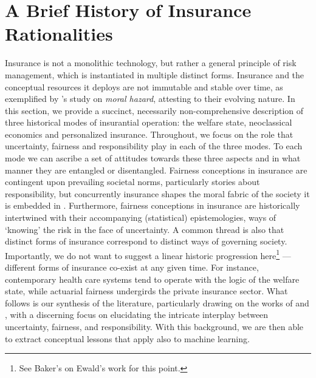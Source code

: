\documentclass[11pt]{article} %
\begin{document}
\section{A Brief History of Insurance Rationalities}
Insurance is not a monolithic technology, but rather a general principle of risk management, which is instantiated in multiple distinct forms. %
Insurance and the conceptual resources it deploys are not immutable and stable over time, as exemplified by \citeauthor{baker1996genealogy}'s \citeyearpar{baker1996genealogy} study on \textit{moral hazard}, attesting to their evolving nature. 
In this section, we provide a succinct, necessarily non-comprehensive description of three historical modes of insurantial operation: the welfare state, neoclassical economics and personalized insurance. 
Throughout, we focus on the role that uncertainty, fairness and responsibility play in each of the three modes.
To each mode we can ascribe a set of attitudes towards these three aspects and in what manner they are entangled or disentangled.
Fairness conceptions in insurance are contingent upon prevailing societal norms, particularly stories about responsibility, but concurrently insurance shapes the moral fabric of the society it is embedded in \citep{glenn2003risk,van2006making,lehtonen2015producing}. Furthermore, fairness conceptions in insurance are historically intertwined with their accompanying (statistical) epistemologies, ways of `knowing' the risk in the face of uncertainty. A common thread is also that distinct forms of insurance correspond to distinct ways of governing society. 
Importantly, we do not want to suggest a linear historic progression here\footnote{See Baker's \citeyearpar[p.\@\xspace 571]{baker2000insuring} on Ewald's work for this point.} 
--- different forms of insurance co-exist at any given time. For instance, contemporary health care systems tend to operate with the logic of the welfare state, while actuarial fairness undergirds the private insurance sector. What follows is our synthesis of the literature, particularly drawing on the works of \citet{ewald_letat_1986} and \citet{frezal2020fairness}, with a discerning focus on elucidating the intricate interplay between uncertainty, fairness, and responsibility. With this background, we are then able to extract conceptual lessons that apply also to machine learning.
\end{document}
